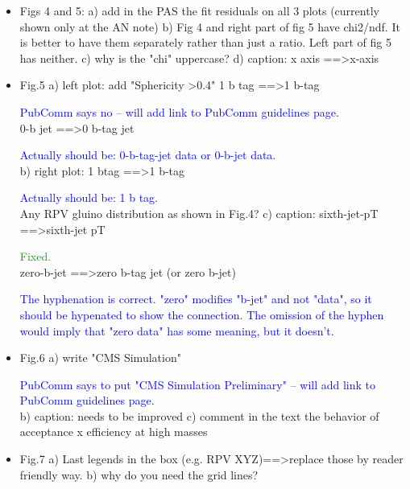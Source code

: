 \documentclass[paper=a4, fontsize=11pt]{scrartcl}
\begin{document}
\begin{itemize}
\item Figs 4 and 5: 
a) add in the PAS the fit residuals on all 3 plots (currently shown only at 
the AN note) 
b) Fig 4 and right part of fig 5 have chi2/ndf. It is better to have them 
separately 
rather than just a ratio. Left part of fig 5 has neither. 
c) why is the "chi" uppercase? 
d) caption: x axis ==\textgreater x-axis 


\item Fig.5 
a) left plot: 
add "Sphericity \textgreater 0.4" 
1 b tag ==\textgreater 1 b-tag 

\textcolor{Blue}{PubComm says no -- will add link to PubComm guidelines page.}\\

0-b jet ==\textgreater 0 b-tag jet 

\textcolor{Blue}{Actually should be: 0-b-tag-jet data or 0-b-jet data.}\\

b) right plot: 
1 btag ==\textgreater 1 b-tag 

\textcolor{Blue}{Actually should be: 1 b tag.}\\

Any RPV gluino distribution as shown in Fig.4? 
c) caption: 
sixth-jet-pT ==\textgreater sixth-jet pT 

\textcolor{ForestGreen}{Fixed.}\\

zero-b-jet ==\textgreater zero b-tag jet (or zero b-jet) 

\textcolor{Blue}{The hyphenation is correct. "zero" modifies "b-jet" and not "data", so it
should be hypenated to show the connection. The omission of the hyphen would imply that "zero data" has some meaning, but it doesn't.}\\

\item Fig.6 
a) write "CMS Simulation" 

\textcolor{Blue}{PubComm says to put "CMS Simulation Preliminary" -- will add link to PubComm guidelines page.}\\

b) caption: needs to be improved 
c) comment in the text the behavior of acceptance x efficiency at high masses 


\item Fig.7 
a) Last legends in the box (e.g. RPV XYZ)==\textgreater replace those by reader friendly 
way. 
b) why do you need the grid lines? 

\end{itemize}
\end{document}
